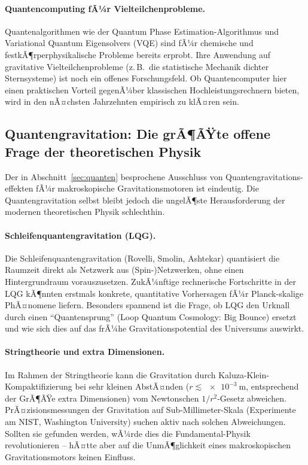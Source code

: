 ﻿\documentclass[12pt, a4paper]{report}
\theoremstyle{definition}
\theoremstyle{remark}
\begin{document}
\paragraph{Quantencomputing fÃ¼r Vielteilchenprobleme.}
Quantenalgorithmen wie der Quantum Phase Estimation-Algorithmus und Variational
Quantum Eigensolvers (VQE) sind fÃ¼r chemische und festkÃ¶rperphysikalische
Probleme bereits erprobt. Ihre Anwendung auf gravitative Vielteilchenprobleme
(z.\,B.\ die statistische Mechanik dichter Sternsysteme) ist noch ein offenes
Forschungsfeld. Ob Quantencomputer hier einen praktischen Vorteil gegenÃ¼ber
klassischen Hochleistungsrechnern bieten, wird in den nÃ¤chsten Jahrzehnten
empirisch zu klÃ¤ren sein.

\subsection{Quantengravitation: Die grÃ¶ÃŸte offene Frage der theoretischen
               Physik}

Der in Abschnitt~\ref{sec:quanten} besprochene Ausschluss von Quantengravitations-
effekten fÃ¼r makroskopische Gravitationsmotoren ist eindeutig. Die Quantengravitation
selbst bleibt jedoch die ungelÃ¶ste Herausforderung der modernen theoretischen
Physik schlechthin.

\paragraph{Schleifenquantengravitation (LQG).}
Die Schleifenquantengravitation (Rovelli, Smolin, Ashtekar) quantisiert die
Raumzeit direkt als Netzwerk aus (Spin-)Netzwerken, ohne einen Hintergrundraum
vorauszusetzen. ZukÃ¼nftige rechnerische Fortschritte in der LQG kÃ¶nnten
erstmals konkrete, quantitative Vorhersagen fÃ¼r Planck-skalige PhÃ¤nomene liefern.
Besonders spannend ist die Frage, ob LQG den Urknall durch einen ``Quantensprung''
(Loop Quantum Cosmology: Big Bounce) ersetzt und wie sich dies auf das frÃ¼he
Gravitationspotential des Universums auswirkt.

\paragraph{Stringtheorie und extra Dimensionen.}
Im Rahmen der Stringtheorie kann die Gravitation durch Kaluza-Klein-Kompaktifizierung
bei sehr kleinen AbstÃ¤nden ($r \lesssim \SI{e-3}{\metre}$, entsprechend der
GrÃ¶ÃŸe extra Dimensionen) vom Newtonschen $1/r^2$-Gesetz abweichen. PrÃ¤zisionsmessungen
der Gravitation auf Sub-Millimeter-Skala (Experimente am NIST, Washington University)
suchen aktiv nach solchen Abweichungen. Sollten sie gefunden werden, wÃ¼rde dies
die Fundamental-Physik revolutionieren -- hÃ¤tte aber auf die UnmÃ¶glichkeit eines
makroskopischen Gravitationsmotors keinen Einfluss.
\end{document}
